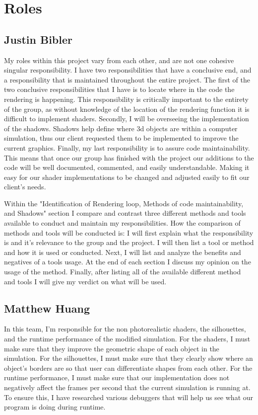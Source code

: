 \documentclass[10pt,journal,compsoc,draftclsnofoot]{IEEEtran}
\begin{document}
\newpage

\section{Roles}

\subsection{Justin Bibler}
My roles within this project vary from each other, and are not one cohesive singular responsibility.
I have two responsibilities that have a conclusive end, and a responsibility that is maintained throughout the entire project.
The first of the two conclusive responsibilities that I have is to locate where in the code the rendering is happening.
This responsibility is critically important to the entirety of the group, as without knowledge of the location of the rendering function it is difficult to implement shaders.
Secondly, I will be overseeing the implementation of the shadows.
Shadows help define where 3d objects are within a computer simulation, thus our client requested them to be implemented to improve the current graphics.
Finally, my last responsibility is to assure code maintainability.
This means that once our group has finished with the project our additions to the code will be well documented, commented, and easily understandable.
Making it easy for our shader implementations to be changed and adjusted easily to fit our client's needs. \par
Within the "Identification of Rendering loop, Methods of code maintainability, and Shadows" section I compare and contrast three different methods and tools available to conduct and maintain my responsibilities.
How the comparison of methods and tools will be conducted is: I will first explain what the responsibility is and it's relevance to the group and the project.
I will then list a tool or method and how it is used or conducted.
Next, I will list and analyze the benefits and negatives of a tools usage.
At the end of each section I discuss my opinion on the usage of the method.
Finally, after listing all of the available different method and tools I will give my verdict on what will be used.

\subsection{Matthew Huang}
In this team, I'm responsible for the non photorealistic shaders, the silhouettes, and the runtime performance of the modified simulation.
For the shaders, I must make sure that they improve the geometric shape of each object in the simulation.
For the silhouettes, I must make sure that they clearly show where an object's borders are so that user can differentiate shapes from each other.
For the runtime performance, I must make sure that our implementation does not negatively affect the frames per second that the current simulation is running at.
To ensure this, I have researched various debuggers that will help us see what our program is doing during runtime.
\end{document}
